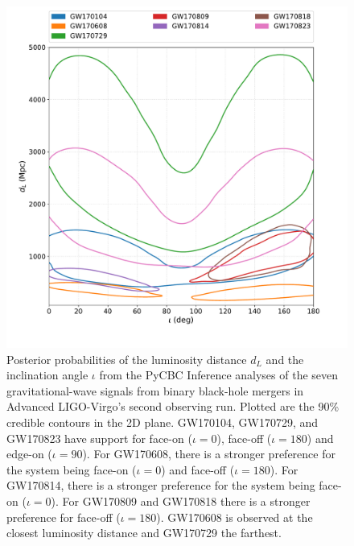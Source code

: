 \begin{figure}[ht]
  \includegraphics[width=\textwidth]{figures/o2_bbh_pe/all_o2_iota_dl.pdf}
  \caption{Posterior probabilities of the luminosity distance $d_L$ and the inclination angle $\iota$ from the PyCBC Inference analyses of the seven gravitational-wave signals from binary black-hole mergers in Advanced LIGO-Virgo's second observing run. Plotted are the 90\% credible contours in the 2D plane. GW170104, GW170729, and GW170823 have support for face-on ($\iota = 0$), face-off ($\iota = 180$) and edge-on ($\iota = 90$). For GW170608, there is a stronger preference for the system being face-on ($\iota = 0$) and face-off ($\iota = 180$). For GW170814, there is a stronger preference for the system being face-on ($\iota = 0$). For GW170809 and GW170818 there is a stronger preference for  face-off ($\iota = 180$). GW170608 is observed at the closest luminosity distance and GW170729 the farthest. \label{fig:dliota_plots}
}
\end{figure}


